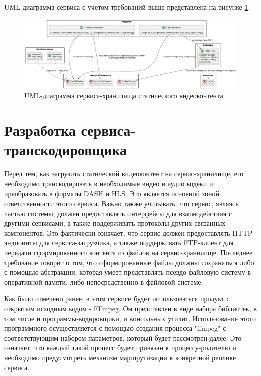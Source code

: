 	UML-диаграмма сервиса с учётом требований выше представлена на рисунке \ref{fig:uml_holder}.

	\begin{figure}[ht!] 
		\center
		\includegraphics [scale=0.33] {my_folder/images//uml_holder}
		\caption{UML-диаграмма сервиса-хранилища статического видеоконтента} 
		\label{fig:uml_holder}  
	\end{figure}
	
	\section{Разработка сервиса-транскодировщика}

	Перед тем, как загрузить статический видеоконтент на сервис-хранилище, его необходимо транскодировать в необходимые видео и аудио кодеки и преобразовать в форматы DASH и HLS. Это является основной зоной ответственности этого сервиса. Важно также учитывать, что сервис, являясь частью системы, должен предоставлять интерфейсы для взаимодействия с другими сервисами, а также поддерживать протоколы других связанных компонентов. Это фактически означает, что сервис должен предоставлять HTTP-эндпоинты для сервиса-загрузчика, а также поддерживать FTP-клиент для передачи сформированного контента из файлов на сервис-хранилище. Последнее требование говорит о том, что сформированные файлы должны сохраняться либо с помощью абстракции, которая умеет представлять псевдо-файловую систему в оперативной памяти, либо непосредственно в файловой системе.

	Как было отмечено ранее, в этом сервисе будет использоваться продукт с открытым исходным кодом - FFmpeg. Он представлен в виде набора библиотек, в том числе и программы-кодировщики, и консольных утилит. Использование этого программного осуществляется с помощью создания процесса "ffmpeg" с соответствующим набором параметров, который будет рассмотрен далее. Это означает, что каждый такой процесс будет привязан к процессу-родителю и необходимо предусмотреть механизм маршрутизации к конкретной реплике сервиса.

